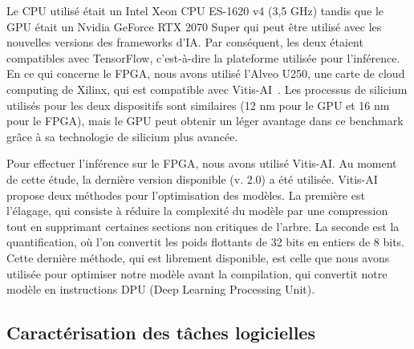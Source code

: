 Le CPU utilisé était un Intel Xeon CPU ES-1620 v4 (3,5 GHz) tandis que le GPU était un Nvidia GeForce RTX 2070 Super qui peut être utilisé avec les nouvelles versions des frameworks d'IA. Par conséquent, les deux étaient compatibles avec TensorFlow, c'est-à-dire la plateforme utilisée pour l'inférence. En ce qui concerne le FPGA, nous avons utilisé l'Alveo U250, une carte de cloud computing de Xilinx, qui est compatible avec Vitis-AI~\cite{vitis-ai}. Les processus de silicium utilisés pour les deux dispositifs sont similaires (12 nm pour le GPU et 16 nm pour le FPGA), mais le GPU peut obtenir un léger avantage dans ce benchmark grâce à sa technologie de silicium plus avancée.

Pour effectuer l'inférence sur le FPGA, nous avons utilisé Vitis-AI. Au moment de cette étude, la dernière version disponible (v. 2.0) a été utilisée. Vitis-AI propose deux méthodes pour l'optimisation des modèles. La première est l'élagage, qui consiste à réduire la complexité du modèle par une compression tout en supprimant certaines sections non critiques de l'arbre. La seconde est la quantification, où l'on convertit les poids flottants de 32 bits en entiers de 8 bits. Cette dernière méthode, qui est librement disponible, est celle que nous avons utilisée pour optimiser notre modèle avant la compilation, qui convertit notre modèle en instructions DPU (Deep Learning Processing Unit).

\subsection{Caractérisation des tâches logicielles}
\label{section:herofake-offline:workload}

